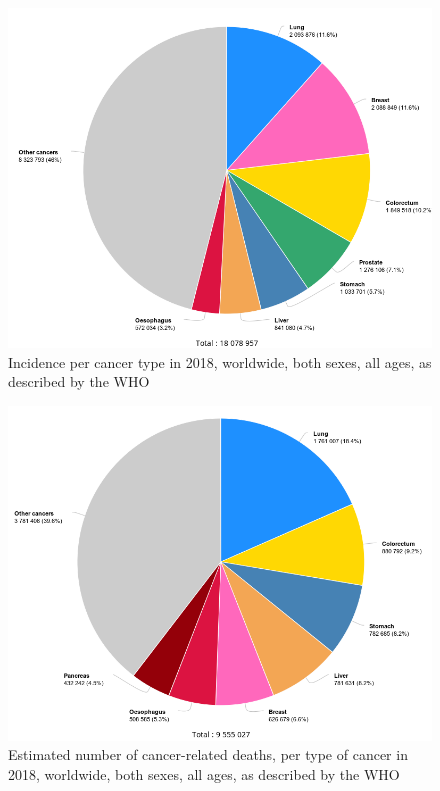 \begin{figure}[th!]
\centering
\includegraphics[width=0.7\linewidth]{images/cancerNewCases}
\caption{Incidence per cancer type in 2018, worldwide, both sexes, all ages, as described by the WHO \cite{OMS}}
\label{fig:cancerNewCases}
\end{figure}
\begin{figure}[th!]
\centering
\includegraphics[width=0.7\linewidth]{images/cancerMortality}
\caption{Estimated number of cancer-related deaths, per type of cancer in 2018, worldwide, both sexes, all ages, as described by the WHO \cite{OMS}}
\label{fig:cancerMortality}
\end{figure}

